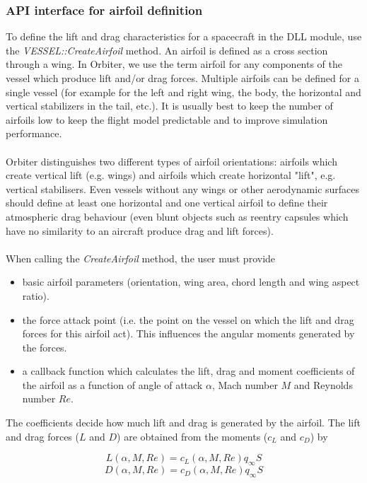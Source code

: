 \documentclass[Orbiter Developer Manual.tex]{subfiles}
\begin{document}
\subsubsection{API interface for airfoil definition}
To define the lift and drag characteristics for a spacecraft in the DLL module, use the \textit{VESSEL::\-CreateAirfoil} method. An airfoil is defined as a cross section through a wing. In Orbiter, we use the term airfoil for any components of the vessel which produce lift and/or drag forces. Multiple airfoils can be defined for a single vessel (for example for the left and right wing, the body, the horizontal and vertical stabilizers in the tail, etc.). It is usually best to keep the number of airfoils low to keep the flight model predictable and to improve simulation performance.\\
\\
Orbiter distinguishes two different types of airfoil orientations: airfoils which create vertical lift (e.g. wings) and airfoils which create horizontal "lift", e.g. vertical stabilisers. Even vessels without any wings or other aerodynamic surfaces should define at least one horizontal and one vertical airfoil to define their atmospheric drag behaviour (even blunt objects such as reentry capsules which have no similarity to an aircraft produce drag and lift forces).\\
\\
When calling the \textit{CreateAirfoil} method, the user must provide
\begin{itemize}
\item basic airfoil parameters (orientation, wing area, chord length and wing aspect ratio).
\item the force attack point (i.e. the point on the vessel on which the lift and drag forces for this airfoil act). This influences the angular moments generated by the forces.
\item a callback function which calculates the lift, drag and moment coefficients of the airfoil as a function of angle of attack $\alpha$, Mach number $M$ and Reynolds number $Re$.
\end{itemize}

\noindent
The coefficients decide how much lift and drag is generated by the airfoil. The lift and drag forces ($L$ and $D$) are obtained from the moments ($c_{L}$ and $c_{D}$) by

\[ L(\alpha,M,Re) = c_{L}(\alpha,M,Re)q_{\infty}S \]
\[ D(\alpha,M,Re) = c_{D}(\alpha,M,Re)q_{\infty}S \]
\end{document}
